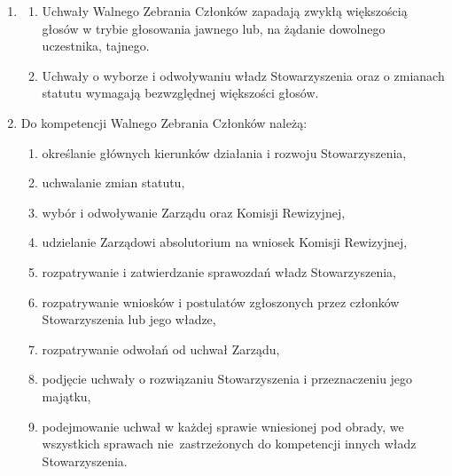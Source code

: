 \documentclass[chapterprefix,notitlepage]{article}
\begin{document}
\begin{enumerate}
	\item \begin{enumerate}
		\item Uchwały Walnego Zebrania Członków zapadają zwykłą większością głosów w trybie głosowania jawnego lub, na żądanie dowolnego uczestnika, tajnego.
		\item Uchwały o wyborze i odwoływaniu władz Stowarzyszenia oraz o zmianach statutu wymagają bezwzględnej większości głosów.
	\end{enumerate}
	
	\item Do kompetencji Walnego Zebrania Członków należą:
	\begin{enumerate}[1)]
	\item określanie głównych kierunków działania i rozwoju Stowarzyszenia,
	\item uchwalanie zmian statutu,
	\item wybór i odwoływanie Zarządu oraz Komisji Rewizyjnej,
	\item udzielanie Zarządowi absolutorium na wniosek Komisji Rewizyjnej,
	\item rozpatrywanie i zatwierdzanie sprawozdań władz Stowarzyszenia,
	\item rozpatrywanie wniosków i postulatów zgłoszonych przez członków Stowarzyszenia lub jego władze,
	\item rozpatrywanie odwołań od uchwał Zarządu,
	\item podjęcie uchwały o rozwiązaniu Stowarzyszenia i przeznaczeniu jego majątku,
	\item podejmowanie uchwał w każdej sprawie wniesionej pod obrady, we wszystkich sprawach nie~zastrzeżonych do kompetencji innych władz Stowarzyszenia.
	\end{enumerate}
	

\end{enumerate}
\end{document}
